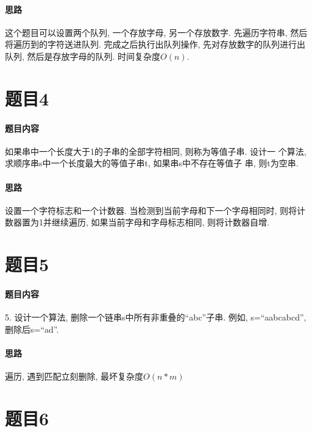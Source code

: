\documentclass[a4paper]{article}
\begin{document}
\paragraph*{思路} 这个题目可以设置两个队列, 一个存放字母, 另一个存放数字. 先遍历字符串, 然后将遍历到的字符送进队列. 完成之后执行出队列操作, 先对存放数字的队列进行出队列, 然后是存放字母的队列. 时间复杂度$O(n)$.



\section*{题目4}

\paragraph*{题目内容} 如果串中一个长度大于1的子串的全部字符相同, 则称为等值子串. 设计一
个算法, 求顺序串s中一个长度最大的等值子串t, 如果串s中不存在等值子
串, 则t为空串.

\paragraph*{思路}
设置一个字符标志和一个计数器. 当检测到当前字母和下一个字母相同时, 则将计数器置为1并继续遍历,
如果当前字母和字母标志相同, 则将计数器自增.



\section*{题目5}

\paragraph*{题目内容}
5. 设计一个算法, 删除一个链串s中所有非重叠的“abc”子串. 例如,
s=“aabcabcd”, 删除后s=“ad”.

\paragraph*{思路}
遍历, 遇到匹配立刻删除, 最坏复杂度$O(n * m)$



\section*{题目6}
\end{document}
